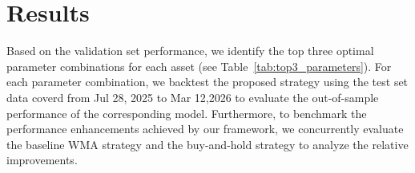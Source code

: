 \documentclass[12pt]{article}
\begin{document}

\section{Results}

Based on the validation set performance, we identify the top three optimal parameter combinations for each asset (see Table~\ref{tab:top3_parameters}). For each parameter combination, we backtest the proposed strategy using the test set data coverd from Jul 28, 2025 to Mar 12,2026 to evaluate the out-of-sample performance of the corresponding model. Furthermore, to benchmark the performance enhancements achieved by our framework, we concurrently evaluate the baseline WMA strategy and the buy-and-hold strategy to analyze the relative improvements.
\end{document}
